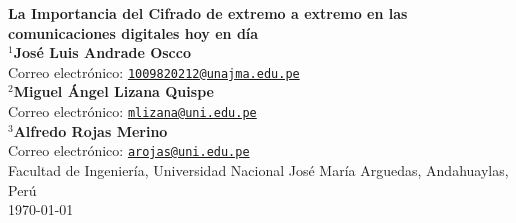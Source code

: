 \documentclass[spanish,12pt,a4paper]{article}
\begin{document}
	
	\begin{flushright}
		{\LARGE \textbf{La Importancia del Cifrado de extremo a extremo en las comunicaciones digitales hoy en día}}\\[1em]
		
		$^{1} $\textbf{José Luis Andrade Oscco}~ \\
		Correo electrónico: \href{mailto:1009820212@unajma.edu.pe}{\texttt{1009820212@unajma.edu.pe}} \\[0.5em]
	
		$^{2} $\textbf{Miguel Ángel Lizana Quispe}~ \\
		Correo electrónico: \href{mailto:mlizana@uni.edu.pe}{\texttt{mlizana@uni.edu.pe}} \\[0.5em]
		
		$^{3} $\textbf{Alfredo Rojas Merino}~ \\
		Correo electrónico: \href{mailto:arojas@uni.edu.pe}{\texttt{arojas@uni.edu.pe}} \\[0.5em]
		
		
		Facultad de Ingeniería, Universidad Nacional José María Arguedas, Andahuaylas, Perú \\
		\today
	\end{flushright}
	
	\vspace{2em} 
	
	
\end{document}
